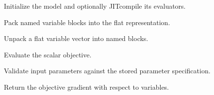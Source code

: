 \documentclass[letterpaper,10pt,english,openany,oneside]{sphinxmanual}
\begin{document}
\begin{fulllineitems}
\sphinxAtStartPar
Initialize the model and optionally JIT\sphinxhyphen{}compile its evaluators.


\begin{fulllineitems}

\pysigstartsignatures
{}
\pysigstopsignatures
\sphinxAtStartPar
Pack named variable blocks into the flat representation.

\end{fulllineitems}



\begin{fulllineitems}

\pysigstartsignatures
{}
\pysigstopsignatures
\sphinxAtStartPar
Unpack a flat variable vector into named blocks.

\end{fulllineitems}



\begin{fulllineitems}

\pysigstartsignatures
{}
\pysigstopsignatures
\sphinxAtStartPar
Evaluate the scalar objective.

\end{fulllineitems}



\begin{fulllineitems}

\pysigstartsignatures
{}
\pysigstopsignatures
\sphinxAtStartPar
Validate input parameters against the stored parameter specification.

\end{fulllineitems}



\begin{fulllineitems}

\pysigstartsignatures
{}
\pysigstopsignatures
\sphinxAtStartPar
Return the objective gradient with respect to variables.


\end{fulllineitems}
\end{fulllineitems}
\end{document}
